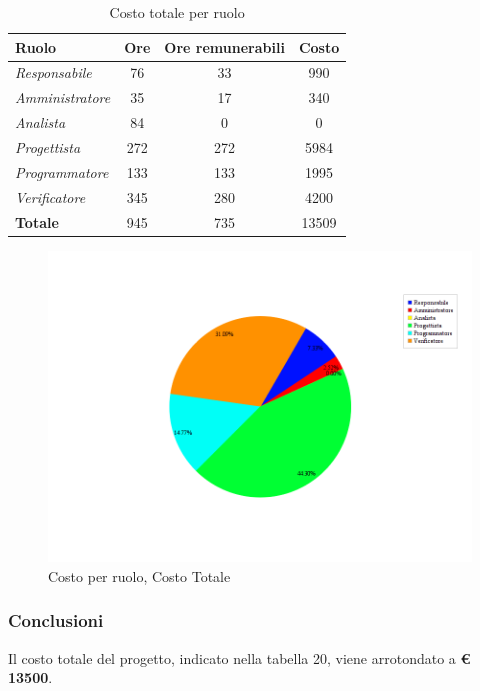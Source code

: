 \begin{table}[H]
	\begin{center}
		\begin{tabular}{|l|c|c|c|}
			\hline
			\textbf{Ruolo}	& \textbf{Ore} &	\textbf{Ore remunerabili}	 &\textbf{Costo} \\
			\hline
			\textit{Responsabile}	&	76	&	33	&	990	\\
			\hline
			\textit{Amministratore}	&	35	&	17	&	340	\\
			\hline
			\textit{Analista}	&	84	&	0	&	0	\\
			\hline
			\textit{Progettista}		&	272	&	272	&	5984	\\
			\hline
			\textit{Programmatore}	&	133	&	133	&	1995	\\
			\hline
			\textit{Verificatore}	&	345	&	280	&	4200	\\
			\hline
			\textbf{Totale}	&	945	&	735	&	13509	\\
			\hline
		\end{tabular}
	\end{center}
	\caption{Costo totale per ruolo}
\end{table}

\begin{figure}[H]
	\centering
	\includegraphics[scale=0.5]{immagini/Grafi/CostoTot}
	\caption{Costo per ruolo, Costo Totale}
\end{figure}

\subsubsection{Conclusioni}
Il costo totale del progetto, indicato nella tabella 20, viene arrotondato a \textbf{€ 13500}.\\
